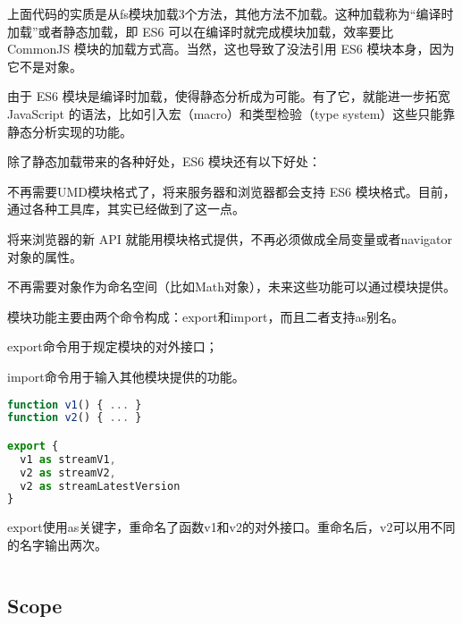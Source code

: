 上面代码的实质是从fs模块加载3个方法，其他方法不加载。这种加载称为“编译时加载”或者静态加载，即 ES6 可以在编译时就完成模块加载，效率要比 CommonJS 模块的加载方式高。当然，这也导致了没法引用 ES6 模块本身，因为它不是对象。


由于 ES6 模块是编译时加载，使得静态分析成为可能。有了它，就能进一步拓宽 JavaScript 的语法，比如引入宏（macro）和类型检验（type system）这些只能靠静态分析实现的功能。


除了静态加载带来的各种好处，ES6 模块还有以下好处：

\begin{compactitem}
\item 不再需要UMD模块格式了，将来服务器和浏览器都会支持 ES6 模块格式。目前，通过各种工具库，其实已经做到了这一点。
\item 将来浏览器的新 API 就能用模块格式提供，不再必须做成全局变量或者navigator对象的属性。
\item 不再需要对象作为命名空间（比如Math对象），未来这些功能可以通过模块提供。
\end{compactitem}


模块功能主要由两个命令构成：export和import，而且二者支持as别名。

\begin{compactitem}
\item export命令用于规定模块的对外接口；
\item import命令用于输入其他模块提供的功能。
\end{compactitem}



\begin{lstlisting}[language=JavaScript]
function v1() { ... }
function v2() { ... }

export {
  v1 as streamV1,
  v2 as streamV2,
  v2 as streamLatestVersion
}
\end{lstlisting}

\begin{compactitem}
\item export使用as关键字，重命名了函数v1和v2的对外接口。重命名后，v2可以用不同的名字输出两次。
\end{compactitem}

\begin{lstlisting}[language=JavaScript]

\end{lstlisting}

\subsection{Scope}


